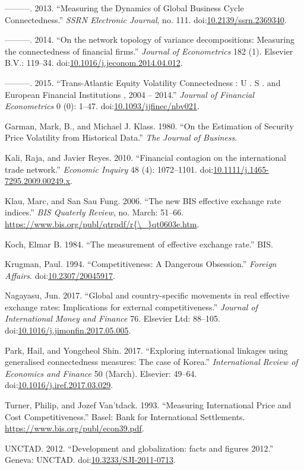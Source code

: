 \documentclass[]{elsarticle} %
\begin{document}
\hypertarget{ref-Diebold2013}{}
---------. 2013. ``Measuring the Dynamics of Global Business Cycle
Connectedness.'' \emph{SSRN Electronic Journal}, no. 111.
doi:\href{https://doi.org/10.2139/ssrn.2369340}{10.2139/ssrn.2369340}.

\hypertarget{ref-Diebold2014}{}
---------. 2014. ``On the network topology of variance decompositions:
Measuring the connectedness of financial firms.'' \emph{Journal of
Econometrics} 182 (1). Elsevier B.V.: 119--34.
doi:\href{https://doi.org/10.1016/j.jeconom.2014.04.012}{10.1016/j.jeconom.2014.04.012}.

\hypertarget{ref-Diebold2015}{}
---------. 2015. ``Trans-Atlantic Equity Volatility Connectedness : U .
S . and European Financial Institutions , 2004 -- 2014.'' \emph{Journal
of Financial Econometrics} 0 (0): 1--47.
doi:\href{https://doi.org/10.1093/jjfinec/nbv021}{10.1093/jjfinec/nbv021}.

\hypertarget{ref-Garman1980}{}
Garman, Mark, B., and Michael J. Klass. 1980. ``On the Estimation of
Security Price Volatility from Historical Data.'' \emph{The Journal of
Business}.

\hypertarget{ref-Kali2010}{}
Kali, Raja, and Javier Reyes. 2010. ``Financial contagion on the
international trade network.'' \emph{Economic Inquiry} 48 (4):
1072--1101.
doi:\href{https://doi.org/10.1111/j.1465-7295.2009.00249.x}{10.1111/j.1465-7295.2009.00249.x}.

\hypertarget{ref-Klau2006}{}
Klau, Marc, and San Sau Fung. 2006. ``The new BIS effective exchange
rate indices.'' \emph{BIS Quaterly Review}, no. March: 51--66.
\href{https://www.bis.org/publ/qtrpdf/r\%7B/_\%7Dqt0603e.htm}{https://www.bis.org/publ/qtrpdf/r\{\textbackslash{}\_\}qt0603e.htm}.

\hypertarget{ref-Koch1984}{}
Koch, Elmar B. 1984. ``The measurement of effective exchange rate.''
BIS.

\hypertarget{ref-Krugman1994}{}
Krugman, Paul. 1994. ``Competitiveness: A Dangerous Obsession.''
\emph{Foreign Affairs}.
doi:\href{https://doi.org/10.2307/20045917}{10.2307/20045917}.

\hypertarget{ref-Nagayasu2017}{}
Nagayasu, Jun. 2017. ``Global and country-specific movements in real
effective exchange rates: Implications for external competitiveness.''
\emph{Journal of International Money and Finance} 76. Elsevier Ltd:
88--105.
doi:\href{https://doi.org/10.1016/j.jimonfin.2017.05.005}{10.1016/j.jimonfin.2017.05.005}.

\hypertarget{ref-Park2017}{}
Park, Hail, and Yongcheol Shin. 2017. ``Exploring international linkages
using generalised connectedness measures: The case of Korea.''
\emph{International Review of Economics and Finance} 50 (March).
Elsevier: 49--64.
doi:\href{https://doi.org/10.1016/j.iref.2017.03.029}{10.1016/j.iref.2017.03.029}.

\hypertarget{ref-Turner1993}{}
Turner, Philip, and Jozef Van'tdack. 1993. ``Measuring International
Price and Cost Competitiveness.'' Basel: Bank for International
Settlements. \url{https://www.bis.org/publ/econ39.pdf}.

\hypertarget{ref-UNCTAD2012}{}
UNCTAD. 2012. ``Development and globalization: facts and figures 2012.''
Geneva: UNCTAD.
doi:\href{https://doi.org/10.3233/SJI-2011-0713}{10.3233/SJI-2011-0713}.
\end{document}
